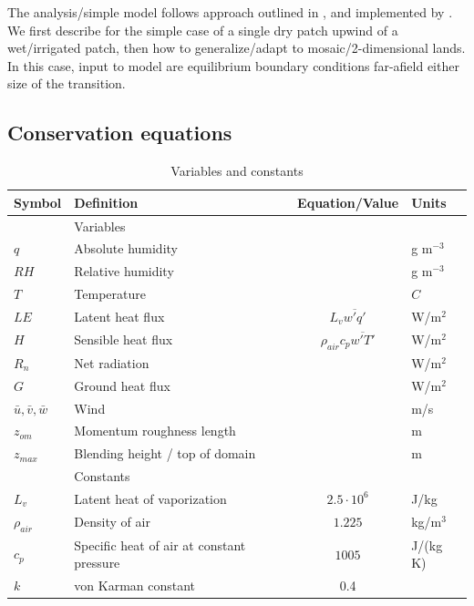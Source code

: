 \documentclass{article}
\begin{document}
    The analysis/simple model follows approach outlined in \citet{brutsaert2013evaporation}, and implemented by \citet{higgins2013measured}.   
    We first describe for the simple case of a single dry patch upwind of a wet/irrigated patch, then how to generalize/adapt to mosaic/2-dimensional lands.
    In this case, input to model are equilibrium boundary conditions far-afield either size of the transition. 

    \subsection{Conservation equations}  

    \begin{table}
    \renewcommand{\arraystretch}{1.3} 
    \caption{Variables and constants}
    \centering
    \begin{tabular}{lp{6cm}cl}
    \hline
    \textbf{Symbol} & \textbf{Definition} & \textbf{Equation/Value} & \textbf{Units} \\
    \hline
    & Variables &  & \\
    \hline
    $q$ & Absolute humidity &  &  g m$^{-3}$ \\
    $RH$ & Relative humidity &  &  g m$^{-3}$ \\
    $T$ & Temperature &  &  $C$ \\
    $LE$ & Latent heat flux & $L_v \overline{w'q'}$ & W/m$^2$  \\
    $H$ & Sensible heat flux & $\rho_{air} c_p \overline{w'T'}$ & W/m$^2$ \\
    $R_n$ & Net radiation &   & W/m$^2$ \\
    $G$ & Ground heat flux &   & W/m$^2$ \\
    $\bar{u}, \bar{v}, \bar{w}$ & Wind &   & m/s \\
    $z_{om}$ & Momentum roughness length &  & m \\
    $z_{max}$& Blending height / top of domain &  & m \\
    \hline
    & Constants &  & \\
    \hline
    $L_v$ & Latent heat of vaporization & $2.5 \cdot 10^6$ & J/kg \\
    $\rho_{air}$ & Density of air & $1.225$ & kg/m$^3$ \\
    $c_p$ & Specific heat of air at constant pressure & $1005$ & J/(kg K) \\
    $k$ & von Karman constant   & 0.4 &  \\
    \hline
    \end{tabular}
    \end{table}
\end{document}
